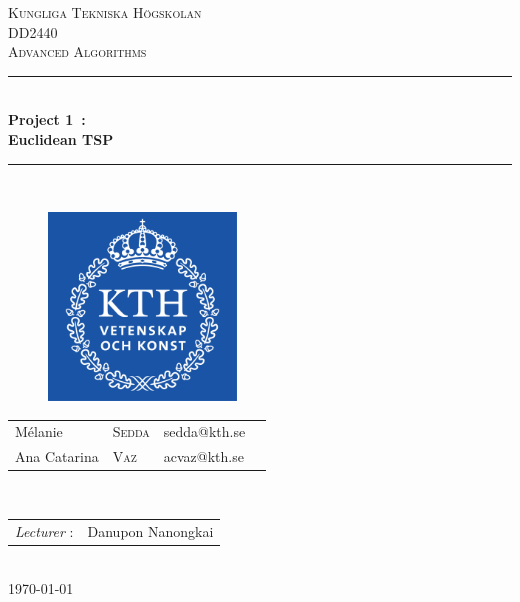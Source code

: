 \documentclass{article}
\begin{document}
\begin{titlepage}
\newcommand{\HRule}{\rule{\linewidth}{0.5mm}} %
\centering %
 
\null
\vspace{2cm}
\textsc{\Large Kungliga Tekniska Högskolan}\\[1cm] %
\textsc{\large DD2440 \\[0.3cm] Advanced Algorithms}\\[0.5cm] %

\vspace{0.5cm}
\HRule \\[0.4cm]
{ \LARGE \bfseries Project 1~: \\ [0.2cm]
\large Euclidean TSP} \\[0.4cm]

\HRule \\[0.5cm]
 
\vspace{1cm}
\begin{figure}[!h]
	\begin{center}
		\includegraphics[width=5cm]{images/kth.png}
	\end{center}
\end{figure}


\vspace{2cm}
\large 
{\begin{tabular}{llll}
 Mélanie & \textsc{Sedda} & sedda@kth.se\\
 Ana Catarina & \textsc{Vaz} & acvaz@kth.se \\
\end{tabular}}
\\[1cm]

\normalsize
{\begin{tabular}{ll}
\textit{Lecturer} : & Danupon Nanongkai\\
\end{tabular}}
\\[1cm]


{\normalsize \today}\\[3cm] %

\newpage

\end{titlepage}
\end{document}
